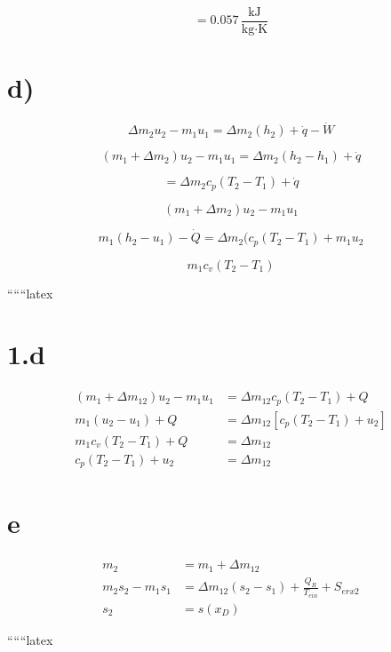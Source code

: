\[
= 0.057 \, \frac{\text{kJ}}{\text{kg} \cdot \text{K}}
\]

\section*{d)}

\[
\Delta m_2 u_2 - m_1 u_1 = \Delta m_2 (h_2) + \dot{q} - \dot{W}
\]

\[
(m_1 + \Delta m_2) u_2 - m_1 u_1 = \Delta m_2 (h_2 - h_1) + \dot{q}
\]

\[
= \Delta m_2 c_p (T_2 - T_1) + \dot{q}
\]

\[
(m_1 + \Delta m_2) u_2 - m_1 u_1
\]

\[
m_1 (h_2 - u_1) - \dot{Q} = \Delta m_2 (c_p (T_2 - T_1) + m_1 u_2
\]

\[
m_1 c_v (T_2 - T_1)
\]

``````latex


\section*{1.d}

\begin{align*}
(m_1 + \Delta m_{12}) u_2 - m_1 u_1 &= \Delta m_{12} c_p (T_2 - T_1) + Q \\
m_1 (u_2 - u_1) + Q &= \Delta m_{12} \left[ c_p (T_2 - T_1) + u_2 \right] \\
m_1 c_v (T_2 - T_1) + Q &= \Delta m_{12} \\
c_p (T_2 - T_1) + u_2 &= \Delta m_{12}
\end{align*}

\section*{e}

\begin{align*}
m_2 &= m_1 + \Delta m_{12} \\
m_2 s_2 - m_1 s_1 &= \Delta m_{12} (s_2 - s_1) + \frac{Q_R}{T_{ein}} + S_{erx2} \\
s_2 &= s(x_D)
\end{align*}

``````latex


